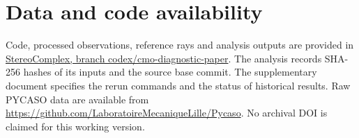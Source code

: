 \documentclass[10pt,a4paper]{article}
\begin{document}
\FloatBarrier
\section*{Data and code availability}
Code, processed observations, reference rays and analysis outputs are provided in \href{https://github.com/jeffwitz/StereoComplex/tree/codex/cmo-diagnostic-paper/paper/cmo}{StereoComplex, branch codex/cmo-diagnostic-paper}. The analysis records SHA-256 hashes of its inputs and the source base commit. The supplementary document specifies the rerun commands and the status of historical results. Raw PYCASO data are available from \url{https://github.com/LaboratoireMecaniqueLille/Pycaso}. No archival DOI is claimed for this working version.


\end{document}
